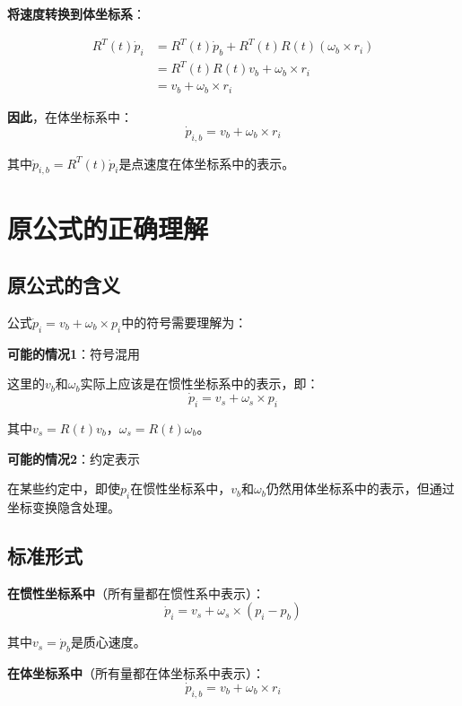\documentclass[12pt,a4paper]{article}
\begin{document}
\textbf{将速度转换到体坐标系}：

\begin{align}
R^T(t) \dot{p}_i &= R^T(t) \dot{p}_b + R^T(t) R(t) (\omega_b \times r_i) \\
&= R^T(t) R(t) v_b + \omega_b \times r_i \\
&= v_b + \omega_b \times r_i
\end{align}

\textbf{因此}，在体坐标系中：
\begin{equation}
\dot{p}_{i,b} = v_b + \omega_b \times r_i
\end{equation}

其中$\dot{p}_{i,b} = R^T(t) \dot{p}_i$是点速度在体坐标系中的表示。

\section{原公式的正确理解}

\subsection{原公式的含义}

公式$\dot{p}_i = v_b + \omega_b \times p_i$中的符号需要理解为：

\textbf{可能的情况1}：符号混用

这里的$v_b$和$\omega_b$实际上应该是在惯性坐标系中的表示，即：
\begin{equation}
\dot{p}_i = v_s + \omega_s \times p_i
\end{equation}

其中$v_s = R(t) v_b$，$\omega_s = R(t) \omega_b$。

\textbf{可能的情况2}：约定表示

在某些约定中，即使$p_i$在惯性坐标系中，$v_b$和$\omega_b$仍然用体坐标系中的表示，但通过坐标变换隐含处理。

\subsection{标准形式}

\textbf{在惯性坐标系中}（所有量都在惯性系中表示）：
\begin{equation}
\dot{p}_i = v_s + \omega_s \times (p_i - p_b)
\end{equation}

其中$v_s = \dot{p}_b$是质心速度。

\textbf{在体坐标系中}（所有量都在体坐标系中表示）：
\begin{equation}
\dot{p}_{i,b} = v_b + \omega_b \times r_i
\end{equation}
\end{document}
